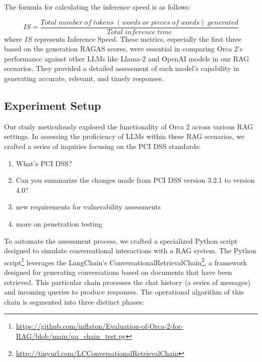 \documentclass[runningheads]{llncs}
\begin{document}

 The formula for calculating the inference speed is as follows:

\[
    IS = \frac{Total\;number\;of\;tokens\;(words\;or\;pieces\;of\;words)\;generated}{Total\;inference\;time}
\]
where $IS$ represents Inference Speed.   
These metrics, especially the first three based on the generation RAGAS\cite{es2023ragas} scores, were essential in comparing Orca 2's performance against other LLMs like Llama-2 and OpenAI models in our RAG scenarios. They provided a detailed assessment of each model's capability in generating accurate, relevant, and timely responses.

\subsection{Experiment Setup}

Our study meticulously explored the functionality of Orca 2 across various RAG settings. In assessing the proficiency of LLMs within these RAG scenarios, we crafted a series of inquiries focusing on the PCI DSS standards:

\begin{enumerate}
    \item What's PCI DSS?
    \item Can you summarize the changes made from PCI DSS version 3.2.1 to version 4.0?
    \item new requirements for vulnerability assessments
    \item more on penetration testing
\end{enumerate}

To automate the assessment process, we crafted a specialized Python script designed to simulate conversational interactions with a RAG system. The Python script\footnote{\url{https://github.com/inflaton/Evaluation-of-Orca-2-for-RAG/blob/main/qa\_chain\_test.py}} leverages the LangChain's ConversationalRetrievalChain\footnote{\url{http://tinyurl.com/LCConversationalRetrievalChain}}, a framework designed for generating conversations based on documents that have been retrieved. This particular chain processes the chat history (a series of messages) and incoming queries to produce responses. The operational algorithm of this chain is segmented into three distinct phases:
\end{document}
